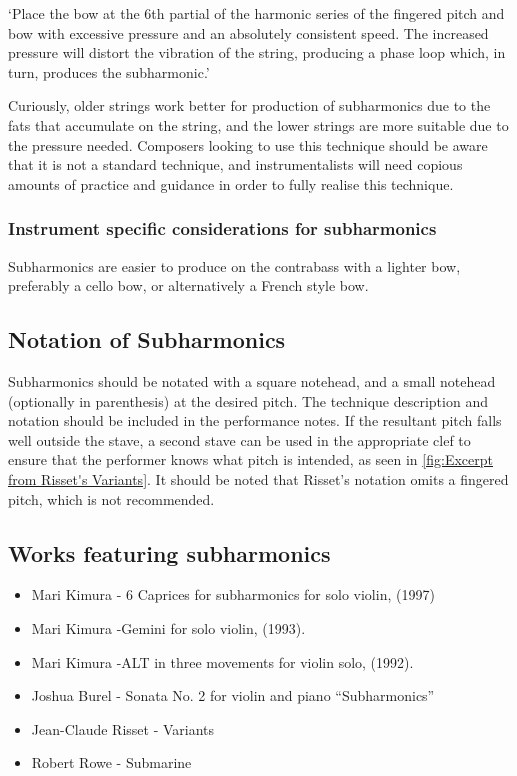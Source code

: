 `Place the bow at the 6th partial of the harmonic series of the fingered pitch and bow with excessive pressure and an absolutely consistent speed. 
The increased pressure will distort the vibration of the string, producing a phase loop which, in turn, produces the subharmonic.'\autocite[]{longModernDoubleBass}

Curiously, older strings work better for production of subharmonics due to the fats that accumulate on the string, and the lower strings are more suitable due to the pressure needed.\autocite{kimuraHowProduceSubharmonics1999}
Composers looking to use this technique should be aware that it is not a standard technique, and instrumentalists will need copious amounts of practice and guidance in order to fully realise this technique.

\subsubsection{Instrument specific considerations for subharmonics}
Subharmonics are easier to produce on the contrabass with a lighter bow, preferably a cello bow, or alternatively a French style bow.\autocite[]{longSubharmonics2019}


\subsection{Notation of Subharmonics} \label{sec:notation-subharmonics}
Subharmonics should be notated with a square notehead, and a small notehead (optionally in parenthesis) at the desired pitch.
The technique description and notation should be included in the performance notes.
If the resultant pitch falls well outside the stave, a second stave can be used in the appropriate clef to ensure that the performer knows what pitch is intended, as seen in \autoref{fig:Excerpt from Risset's Variants}.\autocite[]{rissetVariants1995}
It should be noted that Risset's notation omits a fingered pitch, which is not recommended.

\subsection{Works featuring subharmonics }\label{sec:subharmonicsLiterature}

\begin{itemize}
    \item Mari Kimura - 6 Caprices for subharmonics for solo violin, (1997) 
    \item Mari Kimura -Gemini for solo violin, (1993).
    \item Mari Kimura -ALT in three movements for violin solo, (1992).
    \item Joshua Burel - Sonata No. 2 for violin and piano “Subharmonics”
    \item Jean-Claude Risset - Variants
    \item Robert Rowe - Submarine
\end{itemize}

